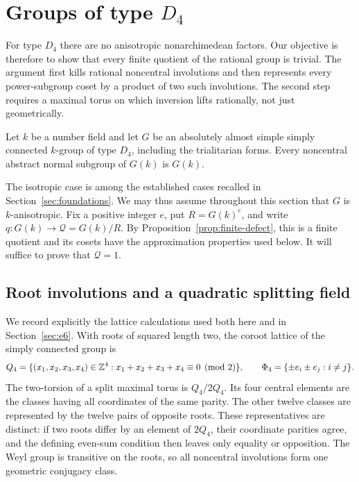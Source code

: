 \section{Groups of type \texorpdfstring{$D_4$}{D4}}\label{sec:d4}

For type $D_4$ there are no anisotropic nonarchimedean factors.  Our
objective is therefore to show that every finite quotient of the rational
group is trivial.  The argument first kills rational noncentral
involutions and then represents every power-subgroup coset by a product of
two such involutions.  The second step requires a maximal torus on which
inversion lifts rationally, not just geometrically.

\begin{theorem}\label{thm:d4}
Let $k$ be a number field and let $G$ be an absolutely almost simple simply
connected $k$-group of type $D_4$, including the trialitarian forms.  Every
noncentral abstract normal subgroup of $G(k)$ is $G(k)$.
\end{theorem}

The isotropic case is among the established cases recalled in
Section~\ref{sec:foundations}.  We may thus assume throughout this section
that $G$ is $k$-anisotropic.  Fix a positive integer $e$, put
$R=G(k)^e$, and write $q:G(k)\to\mathcal Q=G(k)/R$.  By
Proposition~\ref{prop:finite-defect}, this is a finite quotient and its
cosets have the approximation properties used below.  It will suffice to
prove that $\mathcal Q=1$.

\subsection{Root involutions and a quadratic splitting field}

We record explicitly the lattice calculations used both here and in
Section~\ref{sec:e6}.  With roots of squared length two, the coroot lattice
of the simply connected group is
\[
 Q_4=\{(x_1,x_2,x_3,x_4)\in\mathbb Z^4:x_1+x_2+x_3+x_4\equiv0\pmod2\},
 \qquad \Phi_4=\{\pm e_i\pm e_j:i\ne j\}.
\]
The two-torsion of a split maximal torus is $Q_4/2Q_4$.  Its four central
elements are the classes having all coordinates of the same parity.  The
other twelve classes are represented by the twelve pairs of opposite
roots.  These representatives are distinct: if two roots differ by an
element of $2Q_4$, their coordinate parities agree, and the defining
even-sum condition then leaves only equality or opposition.  The Weyl
group is transitive on the roots, so all noncentral involutions form one
geometric conjugacy class.

